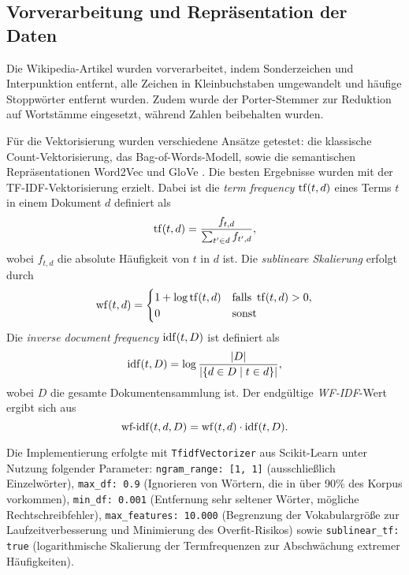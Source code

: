 \subsection{Vorverarbeitung und Repräsentation der Daten}
\label{sec:vorverarbeitung}

Die Wikipedia-Artikel wurden vorverarbeitet, indem Sonderzeichen und Interpunktion entfernt, alle Zeichen in Kleinbuchstaben umgewandelt und häufige Stoppwörter entfernt wurden. Zudem wurde der Porter-Stemmer \cite{Porter2006} zur Reduktion auf Wortstämme eingesetzt, während Zahlen beibehalten wurden.

Für die Vektorisierung wurden verschiedene Ansätze getestet: die klassische Count-Vektorisierung, das Bag-of-Words-Modell, sowie die semantischen Repräsentationen Word2Vec \cite{Mikolov2013} und GloVe \cite{Pennington2014}. Die besten Ergebnisse wurden mit der TF-IDF-Vektorisierung erzielt. Dabei ist die \textit{term frequency} $\operatorname{tf}(t, d)$ eines Terms $t$ in einem Dokument $d$ definiert als
\begin{equation*}
    \operatorname{tf}(t, d) = \frac{f_{t, d}}{\sum_{t'\in d}f_{t', d}},
\end{equation*}
wobei $f_{t, d}$ die absolute Häufigkeit von $t$ in $d$ ist. Die \textit{sublineare Skalierung} erfolgt durch
\begin{equation*}
    \operatorname{wf}(t, d) = \begin{cases}
        1 + \log \operatorname{tf}(t, d) & \text{falls } \operatorname{tf}(t, d) > 0, \\
        0                  & \text{sonst}
    \end{cases}
\end{equation*}
Die \textit{inverse document frequency} $\operatorname{idf}(t, D)$ ist definiert als
\begin{equation*}
    \operatorname{idf}(t, D) = \log\frac{\vert D\vert}{\vert\{d\in D \mid t\in d\}\vert},
\end{equation*}
wobei $D$ die gesamte Dokumentensammlung ist. Der endgültige \textit{WF-IDF}-Wert ergibt sich aus
\begin{equation*}
    \operatorname{wf-idf}(t, d, D) = \operatorname{wf}(t, d)\cdot \operatorname{idf}(t, D).
\end{equation*}

Die Implementierung erfolgte mit \texttt{TfidfVectorizer} aus Scikit-Learn \cite{Pedregosa2011} unter Nutzung folgender Parameter: \texttt{ngram\_range: [1, 1]} (ausschließlich Einzelwörter), \texttt{max\_df: 0.9} (Ignorieren von Wörtern, die in über 90\% des Korpus vorkommen), \texttt{min\_df: 0.001} (Entfernung sehr seltener Wörter, mögliche Rechtschreibfehler), \texttt{max\_features: 10.000} (Begrenzung der Vokabulargröße zur Laufzeitverbesserung und Minimierung des Overfit-Risikos) sowie \texttt{sublinear\_tf: true} (logarithmische Skalierung der Termfrequenzen zur Abschwächung extremer Häufigkeiten).
